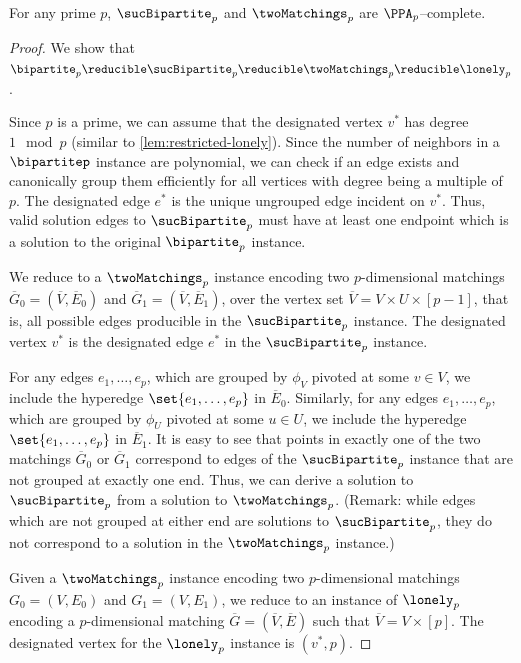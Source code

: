\begin{theorem}\label{thm:succ-bip-complete}
	For any prime $p$, $\sucBipartite_p$ and $\twoMatchings_p$ are $\PPA_p$--complete.
\end{theorem}
\begin{proof}
We show that $\bipartite_p \reducible \sucBipartite_p \reducible \twoMatchings_p \reducible \lonely_p$.\medskip

 Since $p$ is a prime, we can assume that the designated vertex $v^{*}$ has degree $1 \mod{p}$ (similar to \autoref{lem:restricted-lonely}). Since the
number of neighbors in a $\bipartitep$ instance are polynomial, we can
check if an edge exists and canonically group them efficiently for all vertices
with degree being a multiple of $p$. The designated edge $e^{*}$ is the unique ungrouped edge incident on $v^*$. Thus, valid solution edges to $\sucBipartite_p$ must have at least one endpoint which is a solution to the original $\bipartite_p$ instance.\medskip

We reduce to a $\twoMatchings_p$ instance encoding two $p$-dimensional matchings $\overline{G}_0 = (\overline{V}, \overline{E}_0)$ and $\overline{G}_1 = (\overline{V}, \overline{E}_1)$, over the vertex set $\overline{V} = V \times U \times [p-1]$, that is, all possible edges producible in the $\sucBipartite_p$ instance. The designated vertex $v^*$ is the designated edge $e^*$ in the $\sucBipartite_p$ instance.

For any edges $e_1, \ldots, e_p$, which are grouped by $\phi_V$ pivoted at some $v \in V$, we include the hyperedge $\set{e_1, \ldots, e_p}$ in $\overline{E}_0$. Similarly, for any edges $e_1, \ldots, e_p$, which are grouped by $\phi_U$ pivoted at some $u \in U$, we include the hyperedge $\set{e_1, \ldots, e_p}$ in $\overline{E}_1$. It is easy to see that points in exactly one of the two matchings $\overline{G}_0$ or $\overline{G}_1$ correspond to edges of the $\sucBipartite_p$ instance that are not grouped at exactly one end. Thus, we can derive a solution to $\sucBipartite_p$ from a solution to $\twoMatchings_p$. (Remark: while edges which are not grouped at either end are solutions to $\sucBipartite_p$, they do not correspond to a solution in the $\twoMatchings_p$ instance.) \medskip

 Given a $\twoMatchings_p$ instance encoding two $p$-dimensional matchings $G_0 = (V, E_0)$ and $G_1 = (V, E_1)$, we reduce to an instance of $\lonely_p$ encoding a $p$-dimensional matching $\overline{G} = (\overline{V}, \overline{E})$ such that $\overline{V} = V \times [p]$. The designated vertex for the $\lonely_p$ instance is $(v^*,p)$.


\end{proof}
